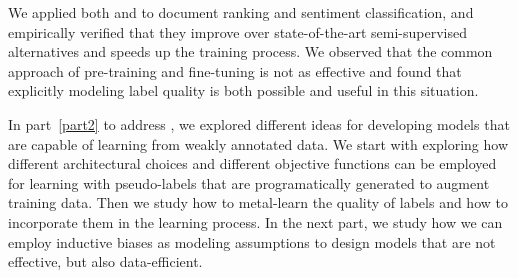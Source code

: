 We applied both \cws and \fwl to document ranking and sentiment classification, and empirically verified that they improve over state-of-the-art semi-supervised alternatives and speeds up the training process. We observed that the common approach of pre-training and fine-tuning is not as effective and found that explicitly modeling label quality is both possible and useful in this situation. 

\bigskip
In part~\ref{part2} to address \textbf{}, we explored different ideas for developing models that are capable of learning from weakly annotated data. We start with exploring how different architectural choices and different objective functions can be employed for learning with pseudo-labels that are programatically generated to augment training data. Then we study how to metal-learn the quality of labels and how to incorporate them in the learning process.
%
In the next part, we study how we can employ inductive biases as modeling assumptions to design models that are not effective, but also data-efficient.